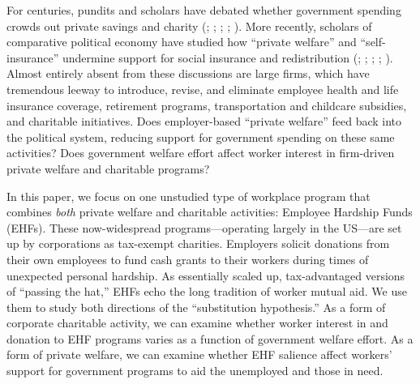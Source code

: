 \documentclass[
  11pt,
  oneside]{article}
\begin{document}
For centuries, pundits and scholars have debated whether government spending crowds out private savings and charity (; ; ; ; ). More recently, scholars of comparative political economy have studied how ``private welfare'' and ``self-insurance'' undermine support for social insurance and redistribution (; ; ; ; ). Almost entirely absent from these discussions are large firms, which have tremendous leeway to introduce, revise, and eliminate employee health and life insurance coverage, retirement programs, transportation and childcare subsidies, and charitable initiatives. Does employer-based ``private welfare'' feed back into the political system, reducing support for government spending on these same activities? Does government welfare effort affect worker interest in firm-driven private welfare and charitable programs?

In this paper, we focus on one unstudied type of workplace program that combines \emph{both} private welfare and charitable activities: Employee Hardship Funds (EHFs). These now-widespread programs---operating largely in the US---are set up by corporations as tax-exempt charities. Employers solicit donations from their own employees to fund cash grants to their workers during times of unexpected personal hardship. As essentially scaled up, tax-advantaged versions of ``passing the hat,'' EHFs echo the long tradition of worker mutual aid. We use them to study both directions of the ``substitution hypothesis.'' As a form of corporate charitable activity, we can examine whether worker interest in and donation to EHF programs varies as a function of government welfare effort. As a form of private welfare, we can examine whether EHF salience affect workers' support for government programs to aid the unemployed and those in need.
\end{document}
